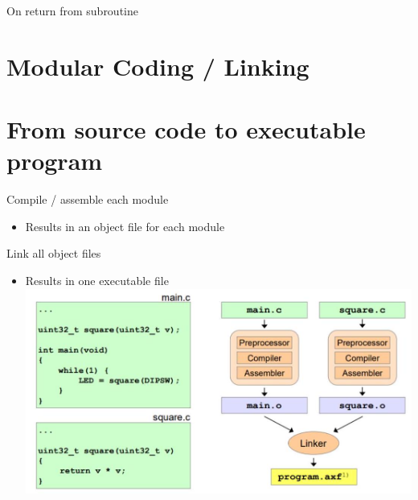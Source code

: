\documentclass[10pt]{article}
\begin{document}
On return from subroutine

\section*{Modular Coding / Linking}
\section*{From source code to executable program}
Compile / assemble each module

\begin{itemize}
  \item Results in an object file for each module
\end{itemize}

Link all object files

\begin{itemize}
  \item Results in one executable file\\
\includegraphics[max width=\textwidth, center]{2024_12_29_79e6b22f503fb7b4f718g-10(2)}
\end{itemize}
\end{document}
